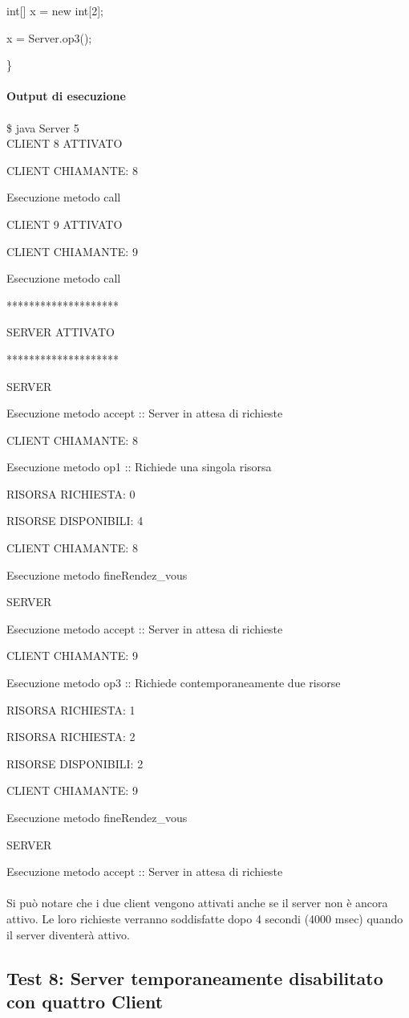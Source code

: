 \documentclass[10pt, a4paper]{article}
\begin{document}
		int[] x = new int[2];

		x = Server.op3();

\}
\\\\
\textbf{Output di esecuzione}
\\\\
\$ java Server 5
\\

CLIENT 8 ATTIVATO

CLIENT CHIAMANTE: 8

Esecuzione metodo call

CLIENT 9 ATTIVATO

CLIENT CHIAMANTE: 9

Esecuzione metodo call

********************

SERVER ATTIVATO

********************

SERVER

Esecuzione metodo accept :: Server in attesa di richieste

CLIENT CHIAMANTE: 8

Esecuzione metodo op1 :: Richiede una singola risorsa

RISORSA RICHIESTA: 0

RISORSE DISPONIBILI: 4

CLIENT CHIAMANTE: 8

Esecuzione metodo fineRendez\_vous

SERVER

Esecuzione metodo accept :: Server in attesa di richieste

CLIENT CHIAMANTE: 9

Esecuzione metodo op3 :: Richiede contemporaneamente due risorse

RISORSA RICHIESTA: 1

RISORSA RICHIESTA: 2

RISORSE DISPONIBILI: 2

CLIENT CHIAMANTE: 9

Esecuzione metodo fineRendez\_vous

SERVER

Esecuzione metodo accept :: Server in attesa di richieste
\\\\
Si può notare che i due client vengono attivati anche se il server non è ancora attivo. Le loro richieste verranno soddisfatte dopo 4 secondi (4000 msec) quando il server diventerà attivo.
\subsection{Test 8: Server temporaneamente disabilitato con quattro Client}
\end{document}
